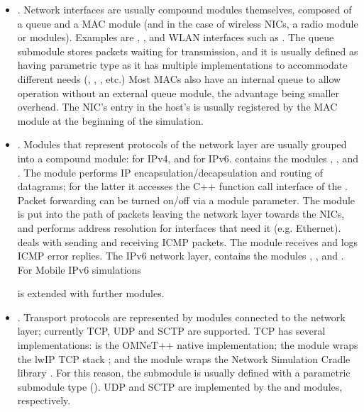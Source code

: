 \begin{itemize}
\item {}. Network interfaces are usually compound modules
themselves, composed of a queue and a MAC module (and in the case of
wireless NICs, a radio module or modules). Examples are
, , and WLAN interfaces
such as . The queue submodule stores packets
waiting for transmission, and it is usually defined as having parametric
type as it has multiple implementations to accommodate different needs
(, , ,
etc.) Most MACs also have an internal queue to allow operation without an
external queue module, the advantage being smaller overhead. The NIC's
entry in the host's  is usually registered by the
MAC module at the beginning of the simulation.

\item {}. Modules that represent protocols of the network
layer are usually grouped into a compound module: 
for IPv4, and  for IPv6. 
contains the modules , ,  and
. The  module performs IP
encapsulation/decapsulation and routing of datagrams; for the latter it
accesses the C++ function call interface of the .
Packet forwarding can be turned on/off via a module parameter. The
 module is put into the path of packets leaving the network
layer towards the NICs, and performs address resolution for interfaces that
need it (e.g. Ethernet).  deals with sending and receiving
ICMP packets. The  module receives and logs ICMP
error replies. The IPv6 network layer,  contains the
modules , , 
and . For Mobile IPv6 simulations 

\iffalse TODO
(xMIPv6 project [TODO]),
\fi

 is extended with further modules.

\item {}. Transport protocols are represented
by modules connected to the network layer; currently TCP, UDP and SCTP are
supported. TCP has several implementations:  is the OMNeT++
native implementation; the  module wraps the lwIP TCP
stack \iffalse [TODO] \fi; and the  module wraps the Network
Simulation Cradle library \iffalse [TODO] \fi. For this reason, the  
submodule is usually defined with a parametric submodule type (). UDP and SCTP are implemented by the  and
 modules, respectively.


\end{itemize}
